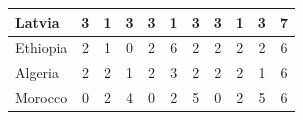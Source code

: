 \documentclass[12pt]{article}  %
\begin{document}
\begin{subappendices}
\begin{longtable}{|l|c|c|c|c|c|c|c|c|c|c|}
	\hline
	Latvia                                                         & 3                                                                      & 1                                                                      & 3                                                                      & 3                                                                      & 1                                                                      & 3                                                                      & 3                         & 1                           & 3                           & 7                           \\ 
	\hline
	Ethiopia                                                       & 2                                                                      & 1                                                                      & 0                                                                      & 2                                                                      & 6                                                                      & 2                                                                      & 2                         & 2                           & 2                           & 6                           \\ 
	\hline
	Algeria                                                        & 2                                                                      & 2                                                                      & 1                                                                      & 2                                                                      & 3                                                                      & 2                                                                      & 2                         & 2                           & 1                           & 6                           \\ 
	\hline
	Morocco                                                        & 0                                                                      & 2                                                                      & 4                                                                      & 0                                                                      & 2                                                                      & 5                                                                      & 0                         & 2                           & 5                           & 6                           \\ 

\end{longtable}
\end{subappendices}
\end{document}
